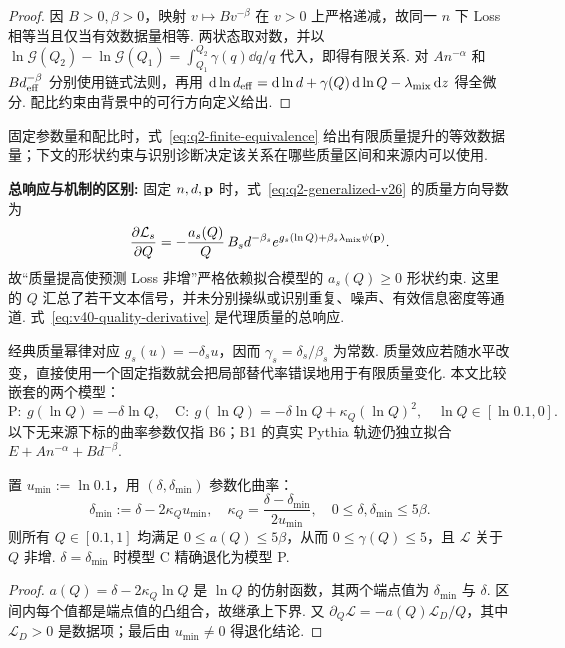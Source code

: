 \begin{proof}
因 $B>0,\beta>0$，映射 $v\mapsto Bv^{-\beta}$ 在 $v>0$ 上严格递减，故同一 $n$ 下 Loss 相等当且仅当有效数据量相等. 两状态取对数，并以 $\ln\mathcal G(Q_2)-\ln\mathcal G(Q_1)=\int_{Q_1}^{Q_2}\gamma(q)\dd q/q$ 代入，即得有限关系. 对 $An^{-\alpha}$ 和 $Bd_{\rm eff}^{-\beta}$ 分别使用链式法则，再用 $\mathop{}\!\mathrm d\ln d_{\rm eff}=\mathop{}\!\mathrm d\ln d+\gamma(Q)\mathop{}\!\mathrm d\ln Q-\lambda_{\mathrm{mix}}\mathop{}\!\mathrm d z$ 得全微分. 配比约束由背景中的可行方向定义给出. 
\end{proof}
固定参数量和配比时，式~\eqref{eq:q2-finite-equivalence} 给出有限质量提升的等效数据量；下文的形状约束与识别诊断决定该关系在哪些质量区间和来源内可以使用. 

\textbf{总响应与机制的区别:}
固定 $n,d,\mathbf p$ 时，式~\eqref{eq:q2-generalized-v26} 的质量方向导数为
\begin{equation}\label{eq:v40-quality-derivative}
\frac{\partial\mathcal L_s}{\partial Q}
=-\frac{a_s(Q)}{Q}\,B_sd^{-\beta_s}
e^{g_s(\ln Q)+\beta_s\lambda_{\mathrm{mix}}\psi(\mathbf p)}.
\end{equation}
故“质量提高使预测 Loss 非增”严格依赖拟合模型的 $a_s(Q)\ge0$ 形状约束. 这里的 $Q$ 汇总了若干文本信号，并未分别操纵或识别重复、噪声、有效信息密度等通道. 式~\eqref{eq:v40-quality-derivative} 是代理质量的总响应. 

经典质量幂律对应 $g_s(u)=-\delta_su$，因而 $\gamma_s=\delta_s/\beta_s$ 为常数. 质量效应若随水平改变，直接使用一个固定指数就会把局部替代率错误地用于有限质量变化. 本文比较嵌套的两个模型：
\begin{equation}\label{eq:q2-power-curved}
\mathrm P:\ g(\ln Q)=-\delta\ln Q,\quad
\mathrm C:\ g(\ln Q)=-\delta\ln Q+\kappa_Q(\ln Q)^2,\quad \ln Q\in[\ln0.1,0].
\end{equation}
以下无来源下标的曲率参数仅指 B6；B1 的真实 Pythia 轨迹仍独立拟合 $E+An^{-\alpha}+Bd^{-\beta}$. 

\begin{proposition}[曲率响应的全区间形状约束]\label{prop:q2-shape}
置 $u_{\min}:=\ln0.1$，用 $(\delta,\delta_{\min})$ 参数化曲率：
\begin{equation}\label{eq:q2-shape}
\delta_{\min}:=\delta-2\kappa_Q u_{\min},\quad
\kappa_Q=\frac{\delta-\delta_{\min}}{2u_{\min}},\quad
0\le\delta,\delta_{\min}\le5\beta.
\end{equation}
则所有 $Q\in[0.1,1]$ 均满足 $0\le a(Q)\le5\beta$，从而 $0\le\gamma(Q)\le5$，且 $\mathcal L$ 关于 $Q$ 非增. $\delta=\delta_{\min}$ 时模型 C 精确退化为模型 P. 
\end{proposition}
\begin{proof}
$a(Q)=\delta-2\kappa_Q\ln Q$ 是 $\ln Q$ 的仿射函数，其两个端点值为 $\delta_{\min}$ 与 $\delta$. 区间内每个值都是端点值的凸组合，故继承上下界. 又 $\partial_Q\mathcal L=-a(Q)\mathcal L_D/Q$，其中 $\mathcal L_D>0$ 是数据项；最后由 $u_{\min}\ne0$ 得退化结论. 
\end{proof}

